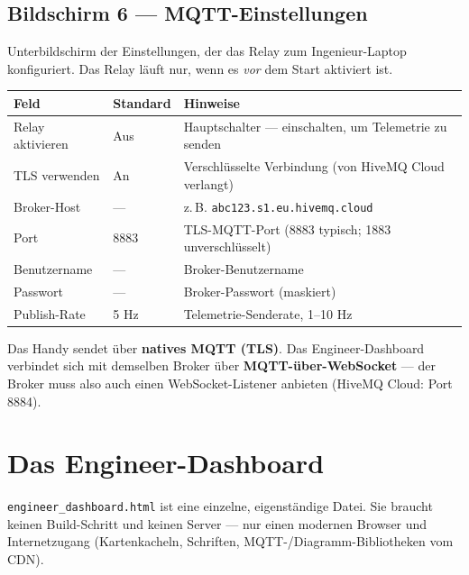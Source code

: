 \documentclass[11pt,a4paper,oneside]{report}
\newcommand{\code}[1]{\texttt{#1}}
\begin{document}
\subsection{Bildschirm 6 --- MQTT-Einstellungen}
Unterbildschirm der Einstellungen, der das Relay zum Ingenieur-Laptop
konfiguriert. Das Relay l\"auft nur, wenn es \emph{vor} dem Start aktiviert ist.

\begin{tabularx}{\linewidth}{@{}llL@{}}
\toprule
\textbf{Feld} & \textbf{Standard} & \textbf{Hinweise}\\
\midrule
Relay aktivieren & Aus & Hauptschalter --- einschalten, um Telemetrie zu senden\\
TLS verwenden & An & Verschl\"usselte Verbindung (von HiveMQ Cloud verlangt)\\
Broker-Host & --- & z.\,B. \code{abc123.s1.eu.hivemq.cloud}\\
Port & 8883 & TLS-MQTT-Port (8883 typisch; 1883 unverschl\"usselt)\\
Benutzername & --- & Broker-Benutzername\\
Passwort & --- & Broker-Passwort (maskiert)\\
Publish-Rate & 5 Hz & Telemetrie-Senderate, 1--10 Hz\\
\bottomrule
\end{tabularx}
\begin{tgnote}
Das Handy sendet \"uber \textbf{natives MQTT (TLS)}. Das Engineer-Dashboard
verbindet sich mit demselben Broker \"uber \textbf{MQTT-\"uber-WebSocket} --- der
Broker muss also auch einen WebSocket-Listener anbieten (HiveMQ Cloud: Port 8884).
\end{tgnote}

\section{Das Engineer-Dashboard}
\code{engineer\_dashboard.html} ist eine einzelne, eigenst\"andige Datei. Sie
braucht keinen Build-Schritt und keinen Server --- nur einen modernen Browser und
Internetzugang (Kartenkacheln, Schriften, MQTT-/Diagramm-Bibliotheken vom CDN).
\end{document}
